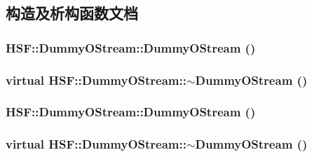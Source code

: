 \subsection{构造及析构函数文档}
\hypertarget{classHSF_1_1DummyOStream_a295657be440a5d921ca7e547526e7188}{
\subsubsection[{DummyOStream}]{\setlength{\rightskip}{0pt plus 5cm}HSF::DummyOStream::DummyOStream ()}}
\label{classHSF_1_1DummyOStream_a295657be440a5d921ca7e547526e7188}
\hypertarget{classHSF_1_1DummyOStream_a525d3b3ad0b0fcf15c630774f9c022ab}{
\subsubsection[{$\sim$DummyOStream}]{\setlength{\rightskip}{0pt plus 5cm}virtual HSF::DummyOStream::$\sim$DummyOStream ()}}
\label{classHSF_1_1DummyOStream_a525d3b3ad0b0fcf15c630774f9c022ab}
\hypertarget{classHSF_1_1DummyOStream_a295657be440a5d921ca7e547526e7188}{
\subsubsection[{DummyOStream}]{\setlength{\rightskip}{0pt plus 5cm}HSF::DummyOStream::DummyOStream ()}}
\label{classHSF_1_1DummyOStream_a295657be440a5d921ca7e547526e7188}
\hypertarget{classHSF_1_1DummyOStream_a525d3b3ad0b0fcf15c630774f9c022ab}{
\subsubsection[{$\sim$DummyOStream}]{\setlength{\rightskip}{0pt plus 5cm}virtual HSF::DummyOStream::$\sim$DummyOStream ()}}
\label{classHSF_1_1DummyOStream_a525d3b3ad0b0fcf15c630774f9c022ab}


